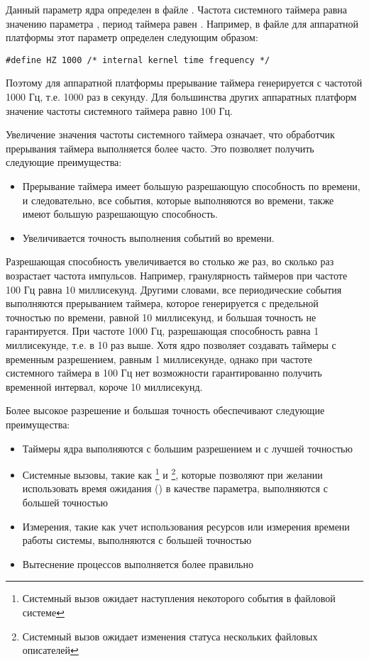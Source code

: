 Данный параметр ядра определен в файле . Частота системного таймера равна значению параметра ,
период таймера равен . Например, в файле  для аппаратной платформы
 этот параметр определен следующим образом:
\begin{lstlisting}
#define HZ 1000 /* internal kernel time frequency */
\end{lstlisting}

Поэтому для аппаратной платформы  прерывание таймера генерируется с частотой 1000 Гц, т.е. 1000 раз в секунду.
Для большинства других аппаратных платформ значение частоты системного таймера равно 100 Гц.
\newpar

Увеличение значения частоты системного таймера означает, что обработчик прерывания таймера
выполняется более часто. Это позволяет получить следующие преимущества:
\begin{itemize}
	\item Прерывание таймера имеет большую разрешающую способность по времени, и
		следовательно, все события, которые выполняются во времени, также имеют большую 
		разрешающую способность.
	\item Увеличивается точность выполнения событий во времени.
\end{itemize}

Разрешающая способность увеличивается во столько же раз, во сколько раз возрастает
частота импульсов. Например, гранулярность таймеров при частоте 100 Гц равна 10 миллисекунд. Другими
словами, все периодические события выполняются прерыванием таймера, которое генерируется с предельной точностью
по времени, равной 10 миллисекунд, и большая точность не гарантируется. При частоте 1000 Гц, разрешающая
способность равна 1 миллисекунде, т.е. в 10 раз выше. Хотя ядро позволяет создавать таймеры с временным
разрешением, равным 1 миллисекунде, однако при частоте системного таймера в 100 Гц нет возможности
гарантированно получить временной интервал, короче 10 миллисекунд.
\newpar

Более высокое разрешение и большая точность обеспечивают следующие преимущества:
\begin{itemize}
	\item Таймеры ядра выполняются с большим разрешением и с лучшей точностью
	\item Системные вызовы, такие как %
\footnote{Системный вызов  ожидает наступления некоторого события в файловой системе} и %
\footnote{Системный вызов  ожидает изменения статуса нескольких файловых описателей}, 
		которые позволяют при желании использовать время ожидания () в 
		качестве параметра, выполняются с большей точностью
	\item Измерения, такие как учет использования ресурсов или измерения времени работы системы, выполняются
		с большей точностью
	\item Вытеснение процессов выполняется более правильно
\end{itemize}

